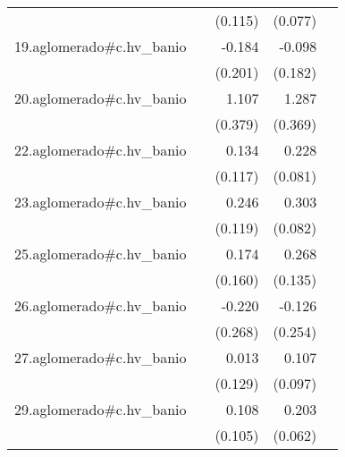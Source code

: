 {\begin{longtable}{l*{4}{D{.}{.}{-1}}}
            &                     &     (0.115)         &     (0.077)         &                     \\
\addlinespace
19.aglomerado#c.hv\_banio&                     &      -0.184         &      -0.098         &                     \\
            &                     &     (0.201)         &     (0.182)         &                     \\
\addlinespace
20.aglomerado#c.hv\_banio&                     &       1.107\sym{**} &       1.287\sym{***}&                     \\
            &                     &     (0.379)         &     (0.369)         &                     \\
\addlinespace
22.aglomerado#c.hv\_banio&                     &       0.134         &       0.228\sym{**} &                     \\
            &                     &     (0.117)         &     (0.081)         &                     \\
\addlinespace
23.aglomerado#c.hv\_banio&                     &       0.246\sym{*}  &       0.303\sym{***}&                     \\
            &                     &     (0.119)         &     (0.082)         &                     \\
\addlinespace
25.aglomerado#c.hv\_banio&                     &       0.174         &       0.268\sym{*}  &                     \\
            &                     &     (0.160)         &     (0.135)         &                     \\
\addlinespace
26.aglomerado#c.hv\_banio&                     &      -0.220         &      -0.126         &                     \\
            &                     &     (0.268)         &     (0.254)         &                     \\
\addlinespace
27.aglomerado#c.hv\_banio&                     &       0.013         &       0.107         &                     \\
            &                     &     (0.129)         &     (0.097)         &                     \\
\addlinespace
29.aglomerado#c.hv\_banio&                     &       0.108         &       0.203\sym{**} &                     \\
            &                     &     (0.105)         &     (0.062)         &                     \\

\end{longtable}}
